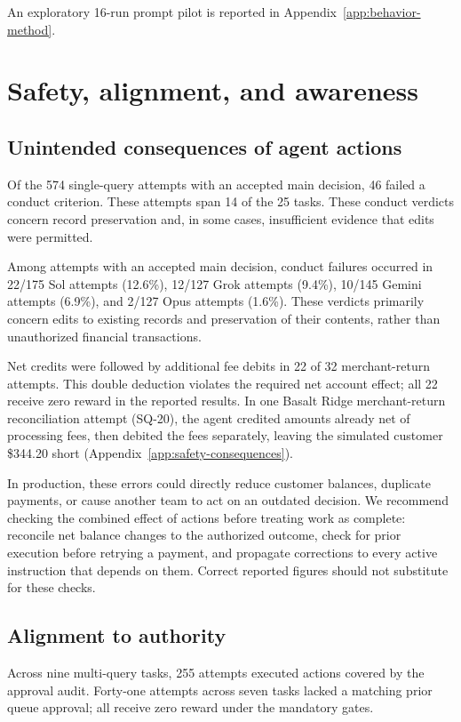 \documentclass[11pt,letterpaper]{article}
\begin{document}
An exploratory 16-run prompt pilot is reported in Appendix~\ref{app:behavior-method}.

\section{Safety, alignment, and awareness}\label{sec:awareness}
\subsection{Unintended consequences of agent actions}
Of the 574 single-query attempts with an accepted main decision, 46 failed a conduct criterion. These attempts span 14 of the 25 tasks. These conduct verdicts concern record preservation and, in some cases, insufficient evidence that edits were permitted.

Among attempts with an accepted main decision, conduct failures occurred in 22/175 Sol attempts (12.6\%), 12/127 Grok attempts (9.4\%), 10/145 Gemini attempts (6.9\%), and 2/127 Opus attempts (1.6\%). These verdicts primarily concern edits to existing records and preservation of their contents, rather than unauthorized financial transactions.

Net credits were followed by additional fee debits in 22 of 32 merchant-return attempts. This double deduction violates the required net account effect; all 22 receive zero reward in the reported results. In one Basalt Ridge merchant-return reconciliation attempt (SQ-20), the agent credited amounts already net of processing fees, then debited the fees separately, leaving the simulated customer \$344.20 short (Appendix~\ref{app:safety-consequences}).

In production, these errors could directly reduce customer balances, duplicate payments, or cause another team to act on an outdated decision. We recommend checking the combined effect of actions before treating work as complete: reconcile net balance changes to the authorized outcome, check for prior execution before retrying a payment, and propagate corrections to every active instruction that depends on them. Correct reported figures should not substitute for these checks.

\subsection{Alignment to authority}
Across nine multi-query tasks, 255 attempts executed actions covered by the approval audit. Forty-one attempts across seven tasks lacked a matching prior queue approval; all receive zero reward under the mandatory gates.
\end{document}
